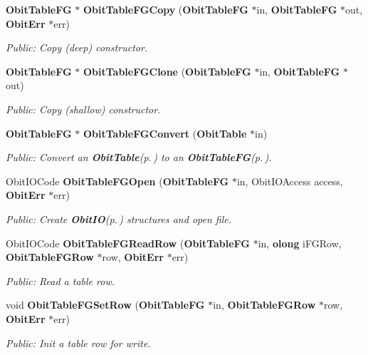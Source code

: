 \begin{CompactItemize}
{\bf Obit\-Table\-FG} $\ast$ {\bf Obit\-Table\-FGCopy} ({\bf Obit\-Table\-FG} $\ast$in, {\bf Obit\-Table\-FG} $\ast$out, {\bf Obit\-Err} $\ast$err)
\begin{CompactList}\small\item\em Public: Copy (deep) constructor. \item\end{CompactList}\item 
{\bf Obit\-Table\-FG} $\ast$ {\bf Obit\-Table\-FGClone} ({\bf Obit\-Table\-FG} $\ast$in, {\bf Obit\-Table\-FG} $\ast$out)
\begin{CompactList}\small\item\em Public: Copy (shallow) constructor. \item\end{CompactList}\item 
{\bf Obit\-Table\-FG} $\ast$ {\bf Obit\-Table\-FGConvert} ({\bf Obit\-Table} $\ast$in)
\begin{CompactList}\small\item\em Public: Convert an {\bf Obit\-Table}{\rm (p.\,\pageref{structObitTable})} to an {\bf Obit\-Table\-FG}{\rm (p.\,\pageref{structObitTableFG})}. \item\end{CompactList}\item 
Obit\-IOCode {\bf Obit\-Table\-FGOpen} ({\bf Obit\-Table\-FG} $\ast$in, Obit\-IOAccess access, {\bf Obit\-Err} $\ast$err)
\begin{CompactList}\small\item\em Public: Create {\bf Obit\-IO}{\rm (p.\,\pageref{structObitIO})} structures and open file. \item\end{CompactList}\item 
Obit\-IOCode {\bf Obit\-Table\-FGRead\-Row} ({\bf Obit\-Table\-FG} $\ast$in, {\bf olong} i\-FGRow, {\bf Obit\-Table\-FGRow} $\ast$row, {\bf Obit\-Err} $\ast$err)
\begin{CompactList}\small\item\em Public: Read a table row. \item\end{CompactList}\item 
void {\bf Obit\-Table\-FGSet\-Row} ({\bf Obit\-Table\-FG} $\ast$in, {\bf Obit\-Table\-FGRow} $\ast$row, {\bf Obit\-Err} $\ast$err)
\begin{CompactList}\small\item\em Public: Init a table row for write. \item\end{CompactList}\item 

\end{CompactItemize}
